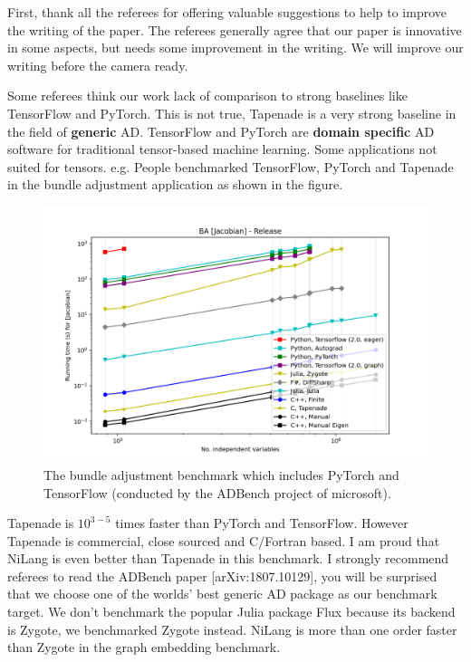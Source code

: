 \documentclass{article}
\begin{document}
First, thank all the referees for offering valuable suggestions to help to improve the writing of the paper.
The referees generally agree that our paper is innovative in some aspects, but needs some improvement in the writing.
We will improve our writing before the camera ready.

Some referees think our work lack of comparison to strong baselines like TensorFlow and PyTorch.
This is not true, Tapenade is a very strong baseline in the field of \textbf{generic} AD.
TensorFlow and PyTorch are \textbf{domain specific} AD software for traditional tensor-based machine learning.
Some applications not suited for tensors.
e.g. People benchmarked TensorFlow, PyTorch and Tapenade in the bundle adjustment application as shown in the figure.
\begin{figure}
    \centerline{\includegraphics[width=0.5\columnwidth,trim={0 0cm 0 0cm},clip]{ba-jacobian-adbench.png}}
    \caption{The bundle adjustment benchmark which includes PyTorch and TensorFlow (conducted by the ADBench project of microsoft).}\label{bench-ba}
\end{figure}
Tapenade is $10^{3-5}$ times faster than PyTorch and TensorFlow. However Tapenade is commercial, close sourced and C/Fortran based.
I am proud that NiLang is even better than Tapenade in this benchmark.
I strongly recommend referees to read the ADBench paper [arXiv:1807.10129], you will be surprised that we choose one of the worlds' best generic AD package as our benchmark target.
We don't benchmark the popular Julia package Flux because its backend is Zygote, we benchmarked Zygote instead. NiLang is more than one order faster than Zygote in the graph embedding benchmark.
\end{document}
